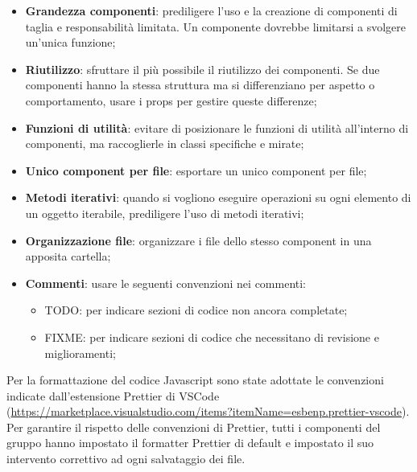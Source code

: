 \documentclass[10pt, a4paper]{article}
\begin{document}
\begin{itemize}
    \item \textbf{Grandezza componenti}: prediligere l'uso e la creazione di componenti di taglia e responsabilità limitata. Un componente dovrebbe limitarsi a svolgere un'unica funzione;
    \item \textbf{Riutilizzo}: sfruttare il più possibile il riutilizzo dei componenti. Se due componenti hanno la stessa struttura ma si differenziano per aspetto o comportamento, usare i props per gestire queste differenze;
    \item \textbf{Funzioni di utilità}: evitare di posizionare le funzioni di utilità all'interno di componenti, ma raccoglierle in classi specifiche e mirate;
    \item \textbf{Unico component per file}: esportare un unico component per file;
    \item \textbf{Metodi iterativi}: quando si vogliono eseguire operazioni su ogni elemento di un oggetto iterabile, prediligere l'uso di metodi iterativi;
    \item \textbf{Organizzazione file}: organizzare i file dello stesso component in una apposita cartella;
    \item \textbf{Commenti}: usare le seguenti convenzioni nei commenti:
        \begin{itemize}
            \item TODO: per indicare sezioni di codice non ancora completate;
            \item FIXME: per indicare sezioni di codice che necessitano di revisione e miglioramenti;
        \end{itemize}
\end{itemize}
 Per la formattazione del codice Javascript sono state adottate le convenzioni indicate dall'estensione Prettier di VSCode (\url{https://marketplace.visualstudio.com/items?itemName=esbenp.prettier-vscode}).
Per garantire il rispetto delle convenzioni di Prettier, tutti i componenti del gruppo hanno impostato il formatter Prettier di default e impostato il suo intervento correttivo ad ogni salvataggio dei file.
\end{document}
